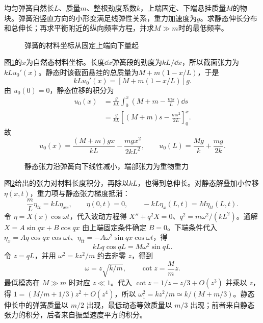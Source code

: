 \begin{exercise}[有质量弹簧悬挂端部重物]\label{ex:sup7-heavyspring}
均匀弹簧自然长$L$、质量$m$、整根劲度系数$k$，上端固定、下端悬挂质量$M$的物块。弹簧沿竖直方向的小形变满足线弹性关系，重力加速度为$g$。求静态伸长分布和总伸长；再求平衡附近的纵向频率方程，并求$M\gg m$时的最低频率。
\begin{figure}[H]\centering
{}
\caption{弹簧的材料坐标从固定上端向下量起}\label{fig:sup7-heavyspring-q}
\end{figure}
\end{exercise}
\begin{solution}
图\ref{fig:sup7-heavyspring-q}的$x$为自然态材料坐标。长度$\dd x$弹簧段的劲度为$kL/\dd x$，所以截面张力为$kLu_0'(x)$。静态时该截面悬挂的总质量为$M+m(1-x/L)$，于是
\[
 kLu_0'(x)=[M+m(1-x/L)]g.
\]
由 $u_0(0)=0$，静态位移的积分为
\[
\begin{aligned}
u_0(x)&=\frac g{kL}\int_0^x\left(M+m-\frac{ms}{L}\right)\dd s\\
&=\frac g{kL}\left[(M+m)s-\frac{ms^2}{2L}\right]_0^x.
\end{aligned}
\]
故
\[
 u_0(x)=\frac{(M+m)gx}{kL}-\frac{mgx^2}{2kL^2},\qquad
 u_0(L)=\frac{Mg}{k}+\frac{mg}{2k}.
\]
\begin{figure}[H]\centering
{}
\caption{静态张力沿弹簧向下线性减小，端部张力为重物重力}\label{fig:sup7-heavyspring-s}
\end{figure}
图\ref{fig:sup7-heavyspring-s}给出的张力对材料长度积分，再除以$kL$，也得到总伸长。对静态解叠加小位移$\eta(x,t)$，重力项与静态张力梯度抵消：
\[
 \frac mL\eta_{tt}=kL\eta_{xx},\qquad
 \eta(0,t)=0,\qquad -kL\eta_x(L,t)=M\eta_{tt}(L,t).
\]
令 $\eta=X(x)\cos\omega t$，代入波动方程得 $X''+q^2X=0$、$q^2=m\omega^2/(kL^2)$。通解 $X=A\sin qx+B\cos qx$ 由上端固定条件确定 $B=0$。下端条件代入 $\eta_x=Aq\cos qx\cos\omega t$、$\eta_{tt}=-A\omega^2\sin qx\cos\omega t$，得
\[
kLq\cos qL=M\omega^2\sin qL.
\]
令 $z=qL$，并用 $\omega^2=kz^2/m$ 约去非零 $z$，得到
\[
 \omega=z\sqrt{k/m},\qquad \cot z=\frac Mm z.
\]
最低模态在 $M\gg m$ 时对应 $z\ll1$。代入 $\cot z=1/z-z/3+O(z^3)$ 并乘以 $z$，得 $1=(M/m+1/3)z^2+O(z^4)$，所以 $\omega_1^2=kz^2/m\simeq k/(M+m/3)$。静态伸长中的弹簧质量以 $m/2$ 出现，最低动态等效质量以 $m/3$ 出现；前者来自静态张力的积分，后者来自振型速度平方的积分。
\end{solution}


